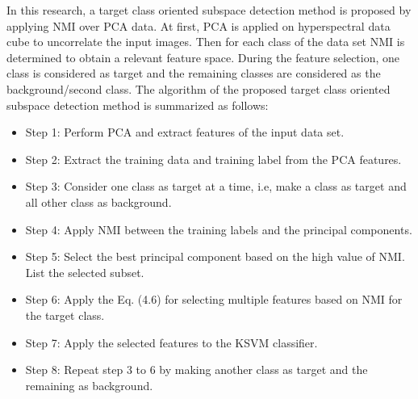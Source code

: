 \documentclass[document.tex]{subfiles}
\begin{document}
In this research, a target class oriented subspace detection method is proposed by applying NMI over PCA data. At first, PCA is applied on hyperspectral data cube to uncorrelate the input images. Then for each class of the data set NMI is determined to obtain a relevant feature space. During the feature selection, one class is considered as target and the remaining classes are considered as the background/second class. The algorithm of the proposed target class oriented subspace detection method is summarized as follows:
\begin{itemize}
\item Step 1: Perform PCA and extract features of the input data set.
\item Step 2: Extract the training data and training label from the
PCA features.
\item Step 3: Consider one class as target at a time, i.e, make a class as target and all other class as background. 
\item Step 4: Apply NMI between the training labels and the principal components.
\item Step 5: Select the best principal component based on the high value of NMI. List the selected subset. 
\item Step 6: Apply the Eq. (4.6) for selecting multiple features based on NMI for the target class.
\item Step 7: Apply the selected features to the KSVM classifier.
\item Step 8: Repeat step 3 to 6 by making another class as target and the remaining as background.
\end{itemize}
\end{document}
